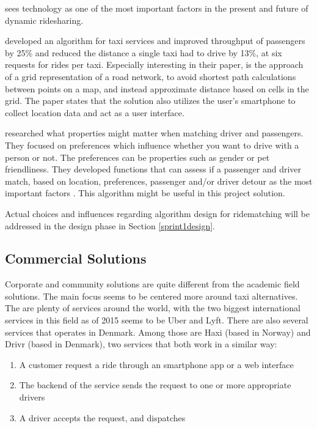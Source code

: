 \citet{doi:10.1080/01441647.2011.621557, amey2011real} sees technology as one of the most important factors in the present and future of dynamic ridesharing.

\citet{ShuoMa2013} developed an algorithm for taxi services and improved throughput of passengers by 25\% and reduced the distance a single taxi had to drive by 13\%, at six requests for rides per taxi. %
Especially interesting in their paper, is the approach of a grid representation of a road network, to avoid shortest path calculations between points on a map, and instead approximate distance based on cells in the grid.
The paper states that the solution also utilizes the user's smartphone to collect location data and act as a user interface.

\citet{ghoseiri2011real} researched what properties might matter when matching driver and passengers.
They focused on preferences which influence whether you want to drive with a person or not. The preferences can be properties such as gender or pet friendliness.
They developed functions that can assess if a passenger and driver match, based on location, preferences, passenger and/or driver detour as the most important factors \cite{ghoseiri2011real}.
This algorithm might be useful in this project solution.

Actual choices and influences regarding algorithm design for ridematching will be addressed in the design phase in Section \ref{sprint1design}.

\subsection{Commercial Solutions}
Corporate and community solutions are quite different from the academic field solutions.
The main focus seems to be centered more around taxi alternatives.
The are plenty of services around the world, with the two biggest international services in this field as of 2015 seems to be Uber and Lyft\cite{ridehail}.
There are also several services that operates in Denmark.
Among those are Haxi (based in Norway) and Drivr (based in Denmark), two services that both work in a similar way: 

\begin{enumerate}
	\item A customer request a ride through an smartphone app or a web interface
	\item The backend of the service sends the request to one or more appropriate drivers
	\item A driver accepts the request, and dispatches
\end{enumerate}

